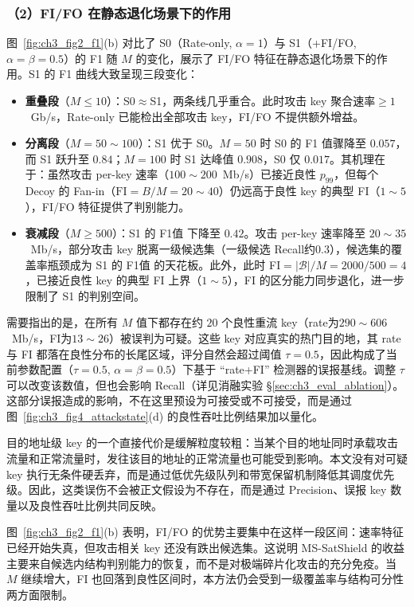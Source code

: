 \subsubsection*{（2）FI/FO 在静态退化场景下的作用}

图~\ref{fig:ch3_fig2_f1}(b) 对比了 S0（Rate-only, $\alpha=1$）与 S1（+FI/FO, $\alpha=\beta=0.5$）的 F1 随 $M$ 的变化，展示了 FI/FO 特征在静态退化场景下的作用。S1 的 F1 曲线大致呈现三段变化：

\begin{itemize}
  \item \textbf{重叠段}（$M\leq10$）：S0$\approx$S1，两条线几乎重合。此时攻击 key 聚合速率$\geq1$~Gb/s，Rate-only 已能检出全部攻击 key，FI/FO 不提供额外增益。
  \item \textbf{分离段}（$M=50\sim100$）：S1 优于 S0。$M=50$ 时 S0 的 F1 值骤降至 $0.057$，而 S1 跃升至 $0.84$；$M=100$ 时 S1 达峰值 $0.908$，S0 仅 $0.017$。其机理在于：虽然攻击 per-key 速率（$100\sim200$~Mb/s）已接近良性 $p_{99}$，但每个 Decoy 的 Fan-in（$\text{FI}=B/M=20\sim40$）仍远高于良性 key 的典型 FI（$1\sim5$），FI/FO 特征提供了判别能力。
  \item \textbf{衰减段}（$M\geq500$）：S1 的 F1值 下降至 $0.42$。攻击 per-key 速率降至 $20\sim35$~Mb/s，部分攻击 key 脱离一级候选集（一级候选 Recall约$0.3$），候选集的覆盖率瓶颈成为 S1 的 F1值 的天花板。此外，此时 FI$=|\mathcal{B}|/M=2000/500=4$，已接近良性 key 的典型 FI 上界（$1\sim5$），FI 的区分能力同步退化，进一步限制了 S1 的判别空间。
\end{itemize}

需要指出的是，在所有 $M$ 值下都存在约 $20$ 个良性重流 key（rate为$290\sim606$~Mb/s，FI为$13\sim26$）被误判为可疑。这些 key 对应真实的热门目的地，其 rate 与 FI 都落在良性分布的长尾区域，评分自然会超过阈值 $\tau=0.5$，因此构成了当前参数配置（$\tau=0.5$, $\alpha=\beta=0.5$）下基于 “rate+FI” 检测器的误报基线。调整 $\tau$ 可以改变该数值，但也会影响 Recall（详见消融实验 \S\ref{sec:ch3_eval_ablation}）。这部分误报造成的影响，不在这里预设为可接受或不可接受，而是通过图~\ref{fig:ch3_fig4_attackstate}(d) 的良性吞吐比例结果加以量化。

目的地址级 key 的一个直接代价是缓解粒度较粗：当某个目的地址同时承载攻击流量和正常流量时，发往该目的地址的正常流量也可能受到影响。本文没有对可疑 key 执行无条件硬丢弃，而是通过低优先级队列和带宽保留机制降低其调度优先级。因此，这类误伤不会被正文假设为不存在，而是通过 Precision、误报 key 数量以及良性吞吐比例共同反映。

图~\ref{fig:ch3_fig2_f1}(b) 表明，FI/FO 的优势主要集中在这样一段区间：速率特征已经开始失真，但攻击相关 key 还没有跌出候选集。这说明 MS-SatShield 的收益主要来自候选内结构判别能力的恢复，而不是对极端碎片化攻击的充分免疫。当 $M$ 继续增大，FI 也回落到良性区间时，本方法仍会受到一级覆盖率与结构可分性两方面限制。


